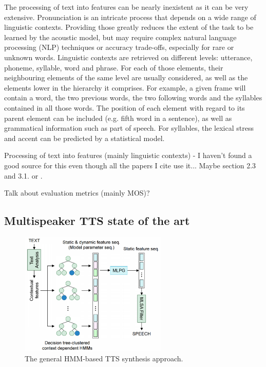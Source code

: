 \documentclass[a4paper, oneside]{article}
\begin{document}
The processing of text into features can be nearly inexistent as it can be very extensive. Pronunciation is an intricate process that depends on a wide range of linguistic contexts. Providing those greatly reduces the extent of the task to be learned by the acoustic model, but may require complex natural language processing (NLP) techniques or accuracy trade-offs, especially for rare or unknown words. Linguistic contexts are retrieved on different levels: utterance, phoneme, syllable, word and phrase. For each of those elements, their neighbouring elements of the same level are usually considered, as well as the elements lower in the hierarchy it comprises. For example, a given frame will contain a word, the two previous words, the two following words and the syllables contained in all those words. The position of each element with regard to its parent element can be included (e.g. fifth word in a sentence), as well as grammatical information such as part of speech. For syllables, the lexical stress and accent can be predicted by a statistical model.

\color{red}
Processing of text into features (mainly linguistic contexts) - I haven't found a good source for this even though all the papers I cite use it... Maybe \cite{OnTheTrainingAspects} section 2.3 and 3.1. or \cite{Tokuda-2013}.
\color{black}

\color{red}Talk about evaluation metrics (mainly MOS)?\color{black}

\subsection{Multispeaker TTS state of the art}
\begin{figure}
	\vspace{0cm}
	\centering
	\includegraphics[width=7cm]{images/hmm_spss.png}
	\caption{The general HMM-based TTS synthesis approach.}
	\label{hmm_spss_framework}
	\vspace{0cm}
\end{figure}
\end{document}
